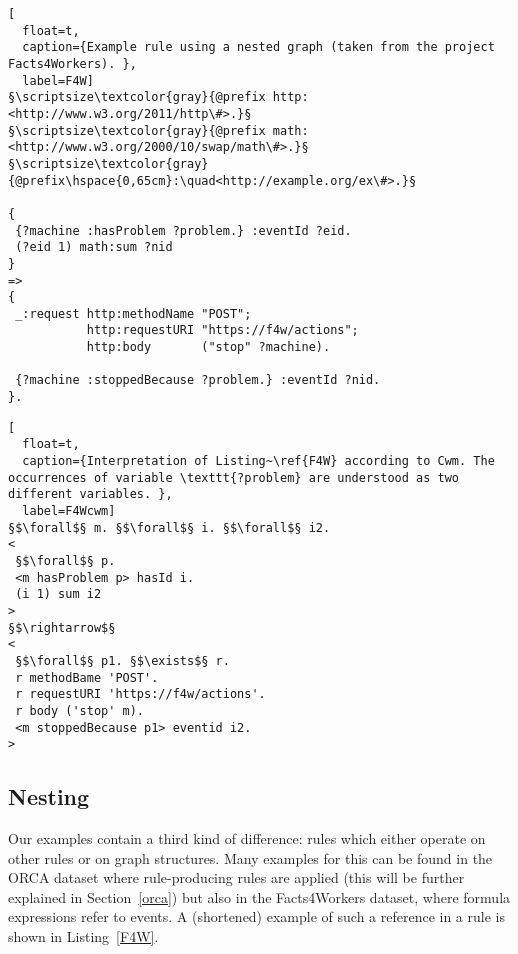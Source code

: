 \begin{lstlisting}[
  float=t,
  caption={Example rule using a nested graph (taken from the project Facts4Workers). },
  label=F4W]
§\scriptsize\textcolor{gray}{@prefix http: <http://www.w3.org/2011/http\#>.}§
§\scriptsize\textcolor{gray}{@prefix math: <http://www.w3.org/2000/10/swap/math\#>.}§
§\scriptsize\textcolor{gray}{@prefix\hspace{0,65cm}:\quad<http://example.org/ex\#>.}§
 
{  
 {?machine :hasProblem ?problem.} :eventId ?eid.
 (?eid 1) math:sum ?nid
}
=>
{
 _:request http:methodName "POST";
           http:requestURI "https://f4w/actions";
           http:body       ("stop" ?machine).
      
 {?machine :stoppedBecause ?problem.} :eventId ?nid.
}. 
\end{lstlisting}
\begin{lstlisting}[
  float=t,
  caption={Interpretation of Listing~\ref{F4W} according to Cwm. The occurrences of variable \texttt{?problem} are understood as two different variables. },
  label=F4Wcwm]
§$\forall$§ m. §$\forall$§ i. §$\forall$§ i2.
<
 §$\forall$§ p.
 <m hasProblem p> hasId i.
 (i 1) sum i2 
> 
§$\rightarrow$§
<
 §$\forall$§ p1. §$\exists$§ r. 
 r methodBame 'POST'. 
 r requestURI 'https://f4w/actions'.
 r body ('stop' m).
 <m stoppedBecause p1> eventid i2. 
>
\end{lstlisting}
\subsection{Nesting}\label{nest}

Our examples contain a third kind of difference:
rules which either operate on other rules or on graph structures. Many examples for this can be found in the 
ORCA dataset where rule-producing rules are applied (this will be further explained in Section~\ref{orca}) but also  in the Facts4Workers dataset, where formula expressions 
refer to events.
A (shortened) example of such a reference in a rule is shown in Listing~\ref{F4W}. 

